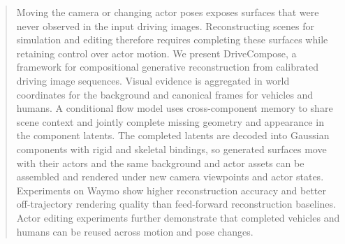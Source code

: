 \begin{abstract}
Moving the camera or changing actor poses exposes surfaces that were never observed in the input driving images. Reconstructing scenes for simulation and editing therefore requires completing these surfaces while retaining control over actor motion. We present DriveCompose, a framework for compositional generative reconstruction from calibrated driving image sequences. Visual evidence is aggregated in world coordinates for the background and canonical frames for vehicles and humans. A conditional flow model uses cross-component memory to share scene context and jointly complete missing geometry and appearance in the component latents. The completed latents are decoded into Gaussian components with rigid and skeletal bindings, so generated surfaces move with their actors and the same background and actor assets can be assembled and rendered under new camera viewpoints and actor states. Experiments on Waymo show higher reconstruction accuracy and better off-trajectory rendering quality than feed-forward reconstruction baselines. Actor editing experiments further demonstrate that completed vehicles and humans can be reused across motion and pose changes.
\end{abstract}
